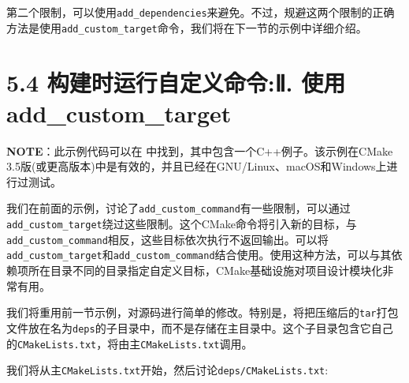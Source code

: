 第二个限制，可以使用\texttt{add\_dependencies}来避免。不过，规避这两个限制的正确方法是使用\texttt{add\_custom\_target}命令，我们将在下一节的示例中详细介绍。


\section{5.4 构建时运行自定义命令:Ⅱ. 使用add\_custom\_target}

\begin{myInfoBox}
\textbf{NOTE}：此示例代码可以在  中找到，其中包含一个C++例子。该示例在CMake 3.5版(或更高版本)中是有效的，并且已经在GNU/Linux、macOS和Windows上进行过测试。
\end{myInfoBox}

我们在前面的示例，讨论了\texttt{add\_custom\_command}有一些限制，可以通过\texttt{add\_custom\_target}绕过这些限制。这个CMake命令将引入新的目标，与\texttt{add\_custom\_command}相反，这些目标依次执行不返回输出。可以将\texttt{add\_custom\_target}和\texttt{add\_custom\_command}结合使用。使用这种方法，可以与其依赖项所在目录不同的目录指定自定义目标，CMake基础设施对项目设计模块化非常有用。


我们将重用前一节示例，对源码进行简单的修改。特别是，将把压缩后的\texttt{tar}打包文件放在名为\texttt{deps}的子目录中，而不是存储在主目录中。这个子目录包含它自己的\texttt{CMakeLists.txt}，将由主\texttt{CMakeLists.txt}调用。


我们将从主\texttt{CMakeLists.txt}开始，然后讨论\texttt{deps/CMakeLists.txt}:

